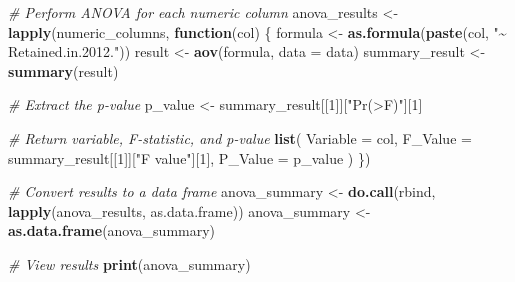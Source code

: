 \documentclass[
]{article}
\newenvironment{Shaded}{\begin{snugshade}}{\end{snugshade}}
\newcommand{\AttributeTok}[1]{\textcolor[rgb]{0.13,0.29,0.53}{#1}}
\newcommand{\CommentTok}[1]{\textcolor[rgb]{0.56,0.35,0.01}{\textit{#1}}}
\newcommand{\ControlFlowTok}[1]{\textcolor[rgb]{0.13,0.29,0.53}{\textbf{#1}}}
\newcommand{\DecValTok}[1]{\textcolor[rgb]{0.00,0.00,0.81}{#1}}
\newcommand{\FunctionTok}[1]{\textcolor[rgb]{0.13,0.29,0.53}{\textbf{#1}}}
\newcommand{\NormalTok}[1]{#1}
\newcommand{\OtherTok}[1]{\textcolor[rgb]{0.56,0.35,0.01}{#1}}
\newcommand{\StringTok}[1]{\textcolor[rgb]{0.31,0.60,0.02}{#1}}
\begin{document}
\begin{Shaded}
\begin{Highlighting}[]
\CommentTok{\# Perform ANOVA for each numeric column}
\NormalTok{anova\_results }\OtherTok{\textless{}{-}} \FunctionTok{lapply}\NormalTok{(numeric\_columns, }\ControlFlowTok{function}\NormalTok{(col) \{}
\NormalTok{  formula }\OtherTok{\textless{}{-}} \FunctionTok{as.formula}\NormalTok{(}\FunctionTok{paste}\NormalTok{(col, }\StringTok{"\textasciitilde{} Retained.in.2012."}\NormalTok{))}
\NormalTok{  result }\OtherTok{\textless{}{-}} \FunctionTok{aov}\NormalTok{(formula, }\AttributeTok{data =}\NormalTok{ data)}
\NormalTok{  summary\_result }\OtherTok{\textless{}{-}} \FunctionTok{summary}\NormalTok{(result)}
  
  \CommentTok{\# Extract the p{-}value}
\NormalTok{  p\_value }\OtherTok{\textless{}{-}}\NormalTok{ summary\_result[[}\DecValTok{1}\NormalTok{]][}\StringTok{"Pr(\textgreater{}F)"}\NormalTok{][}\DecValTok{1}\NormalTok{]}
  
  \CommentTok{\# Return variable, F{-}statistic, and p{-}value}
  \FunctionTok{list}\NormalTok{(}
    \AttributeTok{Variable =}\NormalTok{ col,}
    \AttributeTok{F\_Value =}\NormalTok{ summary\_result[[}\DecValTok{1}\NormalTok{]][}\StringTok{"F value"}\NormalTok{][}\DecValTok{1}\NormalTok{],}
    \AttributeTok{P\_Value =}\NormalTok{ p\_value}
\NormalTok{  )}
\NormalTok{\})}

\CommentTok{\# Convert results to a data frame}
\NormalTok{anova\_summary }\OtherTok{\textless{}{-}} \FunctionTok{do.call}\NormalTok{(rbind, }\FunctionTok{lapply}\NormalTok{(anova\_results, as.data.frame))}
\NormalTok{anova\_summary }\OtherTok{\textless{}{-}} \FunctionTok{as.data.frame}\NormalTok{(anova\_summary)}

\CommentTok{\# View results}
\FunctionTok{print}\NormalTok{(anova\_summary)}
\end{Highlighting}
\end{Shaded}
\end{document}
